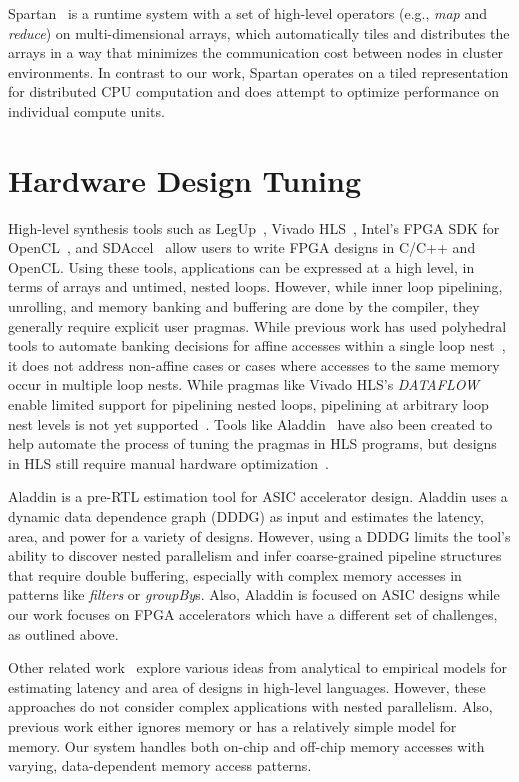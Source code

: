 Spartan~\cite{spartan} is a runtime system with a set of high-level operators
(e.g., \emph{map} and \emph{reduce}) on multi-dimensional arrays, which
automatically tiles and distributes the arrays in a way that minimizes the
communication cost between nodes in cluster environments. In contrast to
our work, Spartan
operates on a tiled representation for distributed CPU computation and does attempt to optimize
performance on individual compute units.

\section{Hardware Design Tuning}
High-level synthesis tools such as LegUp~\cite{legup}, Vivado HLS~\cite{vivadohls}, Intel's FPGA SDK for OpenCL~\cite{opencl_sdk}, and SDAccel~\cite{sdaccel} allow users to write FPGA designs in C/C++ and OpenCL.
Using these tools, applications can be expressed at a high level, in terms of arrays and untimed, nested loops.
However, while inner loop pipelining, unrolling, and memory banking and buffering are done by the compiler, they generally require explicit user pragmas.
While previous work has used polyhedral tools to automate banking decisions for affine accesses within a single loop nest~\cite{Wang_banking},
it does not address non-affine cases or cases where accesses to the same memory occur in multiple loop nests.
While pragmas like Vivado HLS's \emph{DATAFLOW} enable limited support for pipelining nested loops, pipelining at arbitrary loop nest levels is not yet supported~\cite{vivado_userguide}.
Tools like Aladdin~\cite{Aladdin} have also been created to help automate the process of tuning the pragmas in HLS programs, but designs in HLS still require manual hardware optimization~\cite{nane2016survey}.

Aladdin\cite{Aladdin} is a pre-RTL estimation tool for ASIC accelerator design.
Aladdin uses a dynamic data dependence graph (DDDG) as input and estimates the latency, area, and power
for a variety of designs. However, using a DDDG limits the tool's ability to discover nested parallelism
and infer coarse-grained pipeline structures that require double buffering, especially with complex
memory accesses in patterns like \emph{filters} or \emph{groupBy}s. Also, Aladdin is focused on ASIC designs
while our work focuses on FPGA accelerators which have a different set of challenges, as outlined above.

Other related work~\cite{Deng,Bilavarn,MatchEst,Enzler,Bjureus} explore various ideas from analytical to empirical
models for estimating latency and area of designs in high-level languages. However, these approaches do not
consider complex applications with nested parallelism. Also, previous work either ignores memory or has a relatively
simple model for memory. Our system handles both on-chip and off-chip memory accesses
with varying, data-dependent memory access patterns.

